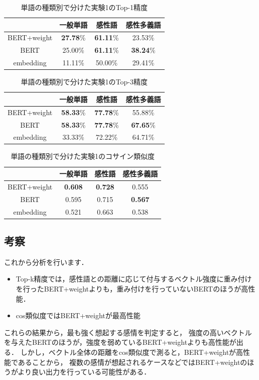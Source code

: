		\begin{table}[H]
			\centering
			\caption{単語の種類別で分けた実験1のTop-1精度}
			\label{table:top-1_hinshi}
				\begin{tabular}{cccc}
					\hline
					& 一般単語 & 感性語 & 感性多義語 \\
					\hline \hline
					BERT+weight & \textbf{27.78}\% & \textbf{61.11}\% & 23.53\% \\
					BERT & 25.00\% & \textbf{61.11}\% & \textbf{38.24}\% \\
					embedding & 11.11\% & 50.00\% & 29.41\% \\
					\hline
				\end{tabular}
		\end{table}

		\begin{table}[H]
			\centering
			\caption{単語の種類別で分けた実験1のTop-3精度}
			\label{table:top3_hinshi}
				\begin{tabular}{cccc}
					\hline
					& 一般単語 & 感性語 & 感性多義語 \\
					\hline \hline
					BERT+weight & \textbf{58.33}\% & \textbf{77.78}\% & 55.88\% \\
					BERT & \textbf{58.33}\% & \textbf{77.78}\% & \textbf{67.65}\% \\
					embedding & 33.33\% & 72.22\% & 64.71\% \\
					\hline
				\end{tabular}
		\end{table}

		\begin{table}[H]
			\centering
			\caption{単語の種類別で分けた実験1のコサイン類似度}
			\label{table:cos_sim_hinshi}
				\begin{tabular}{cccc}
					\hline
					& 一般単語 & 感性語 & 感性多義語 \\
					\hline \hline
					BERT+weight & \textbf{0.608} & \textbf{0.728} & 0.555 \\
					BERT & 0.595 & 0.715 & \textbf{0.567} \\
					embedding & 0.521 & 0.663 & 0.538 \\
					\hline
				\end{tabular}
		\end{table}
	\subsection{考察}
		これから分析を行います．
		\begin{itemize}
			\item Top-k精度では，感性語との距離に応じて付与するベクトル強度に重み付けを行ったBERT+weightよりも，重み付けを行っていないBERTのほうが高性能．
			\item cos類似度ではBERT+weightが最高性能
		\end{itemize}
		これらの結果から，最も強く想起する感情を判定すると，
		強度の高いベクトルを与えたBERTのほうが，強度を弱めているBERT+weightよりも高性能が出る．
		しかし，ベクトル全体の距離をcos類似度で測ると，BERT+weightが高性能であることから，
		複数の感情が想起されるケースなどではBERT+weightのほうがより良い出力を行っている可能性がある．
		
